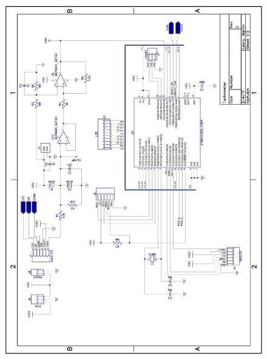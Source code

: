 \documentclass[11pt]{article}
\begin{document}
\begin{figure}[H]
    \centering
    \includegraphics[width=\textwidth]{documents/tach_schem1}
\end{figure}
\end{document}
